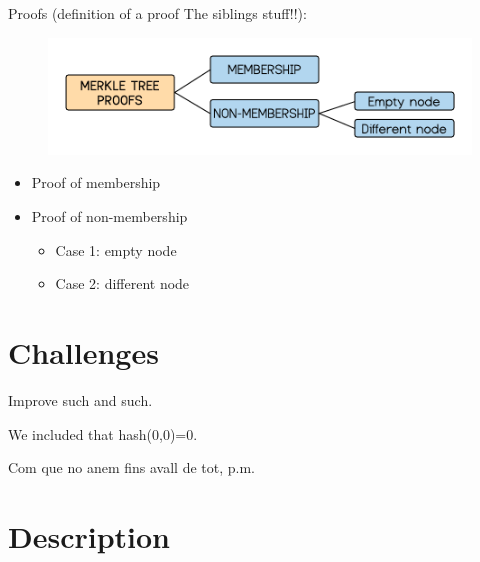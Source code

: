 \documentclass[11pt]{article}
\begin{document}
Proofs (definition of a proof The siblings stuff!!):

\begin{figure}[h]
	\centering
	\includegraphics[scale=0.8]{images/MT-pfs-h.png} 
\end{figure}

\begin{itemize}
	\item Proof of membership
	\item Proof of non-membership
	\begin{itemize}
		\item Case 1: empty node
		\item Case 2: different node
	\end{itemize}
\end{itemize}


\section{Challenges}				%

Improve such and such.

We included that hash(0,0)=0.

Com que no anem fins avall de tot, p.m.


\section{Description}				%
\end{document}
